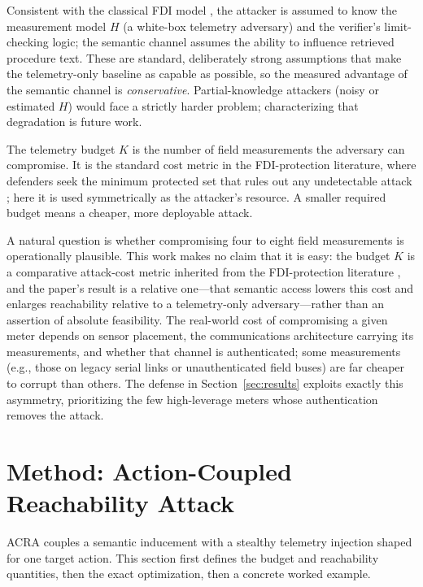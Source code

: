 \documentclass{ieeeaccess}
\begin{document}
Consistent with the classical FDI model \cite{liu,dan}, the attacker is assumed to know the measurement model $H$ (a white-box telemetry adversary) and the verifier's limit-checking logic; the semantic channel assumes the ability to influence retrieved procedure text. These are standard, deliberately strong assumptions that make the telemetry-only baseline as capable as possible, so the measured advantage of the semantic channel is \emph{conservative}. Partial-knowledge attackers (noisy or estimated $H$) would face a strictly harder problem; characterizing that degradation is future work.

The telemetry budget $K$ is the number of field measurements the adversary can compromise. It is the standard cost metric in the FDI-protection literature, where defenders seek the minimum protected set that rules out any undetectable attack \cite{dan,kim}; here it is used symmetrically as the attacker's resource. A smaller required budget means a cheaper, more deployable attack.

A natural question is whether compromising four to eight field measurements is operationally plausible. This work makes no claim that it is easy: the budget $K$ is a comparative attack-cost metric inherited from the FDI-protection literature \cite{dan,kim}, and the paper's result is a relative one---that semantic access lowers this cost and enlarges reachability relative to a telemetry-only adversary---rather than an assertion of absolute feasibility. The real-world cost of compromising a given meter depends on sensor placement, the communications architecture carrying its measurements, and whether that channel is authenticated; some measurements (e.g., those on legacy serial links or unauthenticated field buses) are far cheaper to corrupt than others. The defense in Section~\ref{sec:results} exploits exactly this asymmetry, prioritizing the few high-leverage meters whose authentication removes the attack.

\section{Method: Action-Coupled Reachability Attack}\label{sec:method}
ACRA couples a semantic inducement with a stealthy telemetry injection shaped for one target action. This section first defines the budget and reachability quantities, then the exact optimization, then a concrete worked example.
\end{document}
